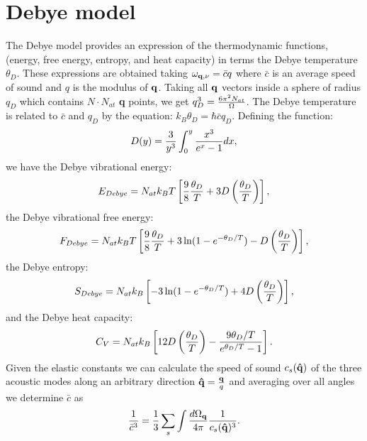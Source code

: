 \documentclass[12pt,a4paper,twoside]{report}
\begin{document}
\newpage

{\color{dark-blue}\chapter{Debye model}}
\color{black}
The Debye model provides an expression of the thermodynamic functions,
(energy, free energy, entropy, and heat capacity) in terms 
the Debye temperature $\theta_D$.
These expressions are obtained taking $\omega_{{\bf q},\nu}=\bar c q$ where
$\bar c$ is an average speed of sound and $q$ is the modulus of ${\bf q}$.
Taking all ${\bf q}$ vectors inside a sphere of radius $q_D$ which
contains $N \cdot N_{at}$ {\bf q} points, we get 
$q_D^3= {6 \pi^2 N_{at} \over \Omega}$. The Debye temperature is related
to $\bar c$ and $q_D$ by the equation: $k_B \theta_D = \hbar \bar c q_D$.
Defining the function:
\begin{equation}
D(y) = {3 \over y^3} \int_0^y {x^3 \over e^x - 1 } dx,
\end{equation}
we have the Debye vibrational energy:
\begin{equation}
E_{Debye} = N_{at} k_B T \left [ {9\over 8} {\theta_D \over T} + 3 D \left({\theta_D \over T}\right) \right],
\end{equation}
the Debye vibrational free energy:
\begin{equation}
F_{Debye} = N_{at} k_B T \left [ {9\over 8} {\theta_D \over T} +3 \ln(1-e^{-\theta_D/T})- D \left({\theta_D \over T}\right) \right],
\end{equation}
the Debye entropy:
\begin{equation}
S_{Debye} = N_{at} k_B \left [- 3 \ln(1-e^{-\theta_D/T})+ 4 D \left({\theta_D \over T}\right) \right],
\end{equation}
and the Debye heat capacity:
\begin{equation}
C_V = N_{at} k_B \left [ 12 D \left({\theta_D \over T}\right) - { 9\theta_D/T \over 
e^{\theta_D/T} -1 } \right].
\end{equation}
\newpage
Given the elastic constants we can calculate the speed of sound 
$c_s({\bf \hat q})$ of the three acoustic modes along an
arbitrary direction ${\bf \hat q}={{\bf q} \over q}$ and 
averaging over all angles
we determine $\bar c$ as 
\begin{equation}
{1\over \bar c^3} = {1\over 3} \sum_s \int {d \Omega_{\bf q} \over 4 \pi }
{1\over c_s({\bf \hat q})^3}.
\end{equation}

\newpage
\end{document}

